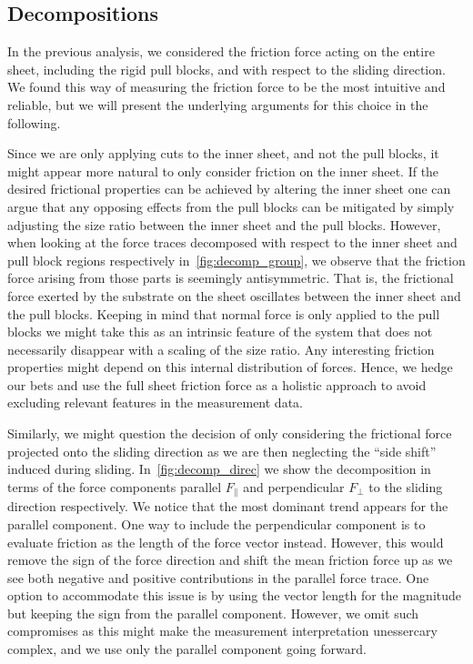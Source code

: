 \subsection{Decompositions}
In the previous analysis, we considered the friction force acting on the entire
sheet, including the rigid pull blocks, and with respect to the sliding
direction. We found this way of measuring the friction force to be the most
intuitive and reliable, but we will present the underlying arguments for this
choice in the following.

Since we are only applying cuts to the inner sheet, and not the pull blocks, it
might appear more natural to only consider friction on the inner sheet. If the
desired frictional properties can be achieved by altering the inner sheet one
can argue that any opposing effects from the pull blocks can be mitigated by
simply adjusting the size ratio between the inner sheet and the pull blocks.
However, when looking at the force traces decomposed with respect to the inner
sheet and pull block regions respectively in~\cref{fig:decomp_group}, we observe
that the friction force arising from those parts is seemingly antisymmetric.
That is, the frictional force exerted by the substrate on the sheet oscillates
between the inner sheet and the pull blocks. Keeping in mind that normal force
is only applied to the pull blocks we might take this as an intrinsic feature of
the system that does not necessarily disappear with a scaling of the size ratio.
Any interesting friction properties might depend on this internal distribution
of forces. Hence, we hedge our bets and use the full sheet friction force as a
holistic approach to avoid excluding relevant features in the measurement data.

Similarly, we might question the decision of only considering the frictional
force projected onto the sliding direction as we are then neglecting the ``side
shift'' induced during sliding. In~\cref{fig:decomp_direc} we show the
decomposition in terms of the force components parallel $F_{\parallel}$ and
perpendicular $F_{\perp}$ to the sliding direction respectively. We notice that
the most dominant trend appears for the parallel component. One way to include
the perpendicular component is to evaluate friction as the length of the force
vector instead. However, this would remove the sign of the force direction and
shift the mean friction force up as we see both negative and positive
contributions in the parallel force trace. One option to accommodate this issue
is by using the vector length for the magnitude but keeping the sign from the
parallel component. However, we omit such compromises as this might make the
measurement interpretation unessercary complex, and we use only the parallel
component going forward. 

